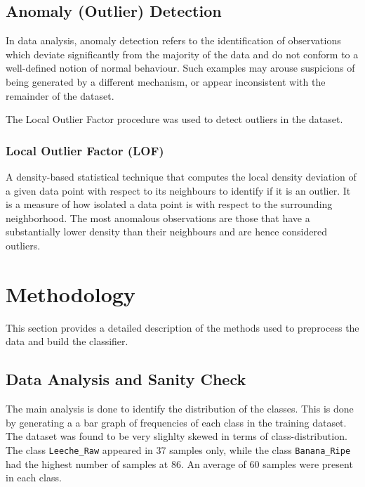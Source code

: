 \documentclass[conference]{IEEEtran}
\begin{document}
    \subsection{Anomaly (Outlier) Detection}
    \label{sec:outlier}
    In data analysis, anomaly detection refers to the identification of observations which deviate significantly from the
    majority of the data and do not conform to a well-defined notion of normal behaviour.
    Such examples may arouse suspicions of being generated by a different mechanism, or appear inconsistent with the
    remainder of the dataset.

    The Local Outlier Factor procedure was used to detect outliers in the dataset.
    \vspace*{3.0pt}

    \subsubsection{Local Outlier Factor (LOF)}
    \label{sec:lof}
    A density-based statistical technique that computes the local density deviation of a given data point with respect
    to its neighbours to identify if it is an outlier.
    It is a measure of how isolated a data point is with respect to the surrounding neighborhood.
    The most anomalous observations are those that have a substantially lower density than their neighbours and are
    hence considered outliers.

    \section{Methodology}
    \label{sec:methodology}
    This section provides a detailed description of the methods used to preprocess the data and build the classifier.

    \subsection{Data Analysis and Sanity Check}
    \label{sec:dataanalysis}
    The main analysis is done to identify the distribution of the classes.
    This is done by generating a a bar graph of frequencies of each class in the training dataset.
    The dataset was found to be very slighlty skewed in terms of class-distribution.
    The class \texttt{Leeche\_Raw} appeared in 37 samples only, while the class \texttt{Banana\_Ripe} had the highest
    number of samples at 86.
    An average of 60 samples were present in each class.
\end{document}
